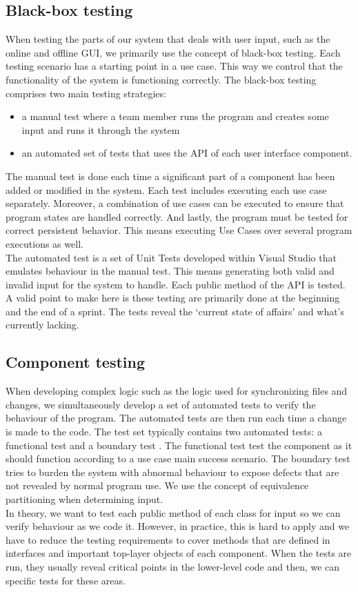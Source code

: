 \subsection{Black-box testing}
When testing the parts of our system that deals with user input, such as the online and offline GUI, we primarily use the concept of black-box testing. Each testing scenario has a starting point in a use case. This way we control that the functionality of the system is functioning correctly. 
The black-box testing comprises two main testing strategies: 
\begin{itemize}
\item a manual test where a team member runs the program and creates some input and runs it through the system
\item an automated set of tests that uses the API of each user interface component.
\end{itemize}
The manual test is done each time a significant part of a component has been added or modified in the system. Each test includes executing each use case separately. Moreover, a combination of use cases can be executed to ensure that program states are handled correctly. And lastly, the program must be tested for correct persistent behavior. This means executing Use Cases over several program executions as well.\\
The automated test is a set of Unit Tests developed within Visual Studio that emulates behaviour in the manual test. This means generating both valid and invalid input for the system to handle. Each public method of the API is tested. A valid point to make here is these testing are primarily done at the beginning and the end of a sprint. The tests reveal the ‘current state of affairs’ and what’s currently lacking.
\subsection{Component testing}
When developing complex logic such as the logic used for synchronizing files and changes, we simultaneously develop a set of automated tests to verify the behaviour of the program. The automated tests are then run each time a change is made to the code. The test set typically contains two automated tests: a functional test and a boundary test \cite[p.~214]{se9}. The functional test test the component as it should function according to a use case main success scenario. The boundary test tries to burden the system with abnormal behaviour to expose defects that are not revealed by normal program use. We use the concept of equivalence partitioning when determining input. \\
In theory, we want to test each public method of each class for input so we can verify behaviour as we code it. However, in practice, this is hard to apply and we have to reduce the testing requirements to cover methods that are defined in interfaces and important top-layer objects of each component. When the tests are run, they usually reveal critical points in the lower-level code and then, we can specific tests for these areas.
